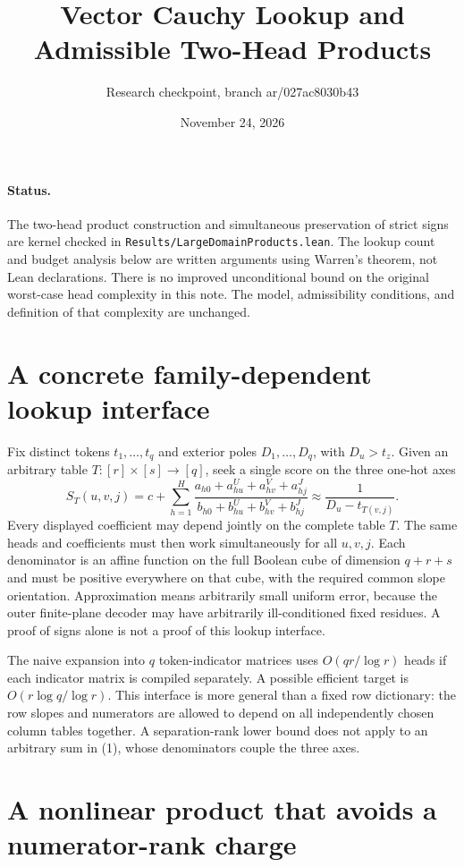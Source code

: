\documentclass[11pt]{article}
\title{Vector Cauchy Lookup and Admissible Two-Head Products}
\author{Research checkpoint, branch ar/027ac8030b43}
\date{November 24, 2026}
\begin{document}
\maketitle

\paragraph{Status.}
The two-head product construction and simultaneous preservation of strict
signs are kernel checked in \texttt{Results/LargeDomainProducts.lean}.
The lookup count and budget analysis below are written arguments using
Warren's theorem, not Lean declarations. There is no improved unconditional
bound on the original worst-case head complexity in this note. The model,
admissibility conditions, and definition of that complexity are unchanged.

\section{A concrete family-dependent lookup interface}

Fix distinct tokens $t_1,\ldots,t_q$ and exterior poles
$D_1,\ldots,D_q$, with $D_u>t_z$. Given an arbitrary table
$T:[r]\times[s]\to[q]$, seek a single score on the three one-hot axes
\[
 S_T(u,v,j)=c+\sum_{h=1}^H
 \frac{a_{h0}+a^U_{hu}+a^V_{hv}+a^J_{hj}}
      {b_{h0}+b^U_{hu}+b^V_{hv}+b^J_{hj}}
 \approx\frac1{D_u-t_{T(v,j)}}.
 \tag{1}
\]
Every displayed coefficient may depend jointly on the complete table $T$.
The same heads and coefficients must then work simultaneously for all
$u,v,j$. Each denominator is an affine function on the full Boolean cube
of dimension $q+r+s$ and must be positive everywhere on that cube, with
the required common slope orientation. Approximation means arbitrarily
small uniform error, because the outer finite-plane decoder may have
arbitrarily ill-conditioned fixed residues. A proof of signs alone is not
a proof of this lookup interface.

The naive expansion into $q$ token-indicator matrices uses
$O(qr/\log r)$ heads if each indicator matrix is compiled separately.
A possible efficient target is $O(r\log q/\log r)$. This interface is more
general than a fixed row dictionary: the row slopes and numerators are
allowed to depend on all independently chosen column tables together.
A separation-rank lower bound does not apply to an arbitrary sum in (1),
whose denominators couple the three axes.

\section{A nonlinear product that avoids a numerator-rank charge}
\end{document}
